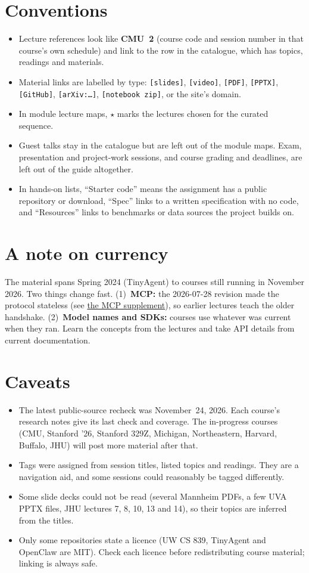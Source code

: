 \documentclass[10pt,oneside]{report}
\begin{document}
\section{Conventions}
\begin{itemize}
\item Lecture references look like \textbf{CMU~2} (course code and session number in that course's own schedule) and link to the row in the catalogue, which has topics, readings and materials.
\item Material links are labelled by type: \texttt{[slides]}, \texttt{[video]}, \texttt{[PDF]}, \texttt{[PPTX]}, \texttt{[GitHub]}, \texttt{[arXiv:\ldots]}, \texttt{[notebook zip]}, or the site's domain.
\item In module lecture maps, $\star$ marks the lectures chosen for the curated sequence.
\item Guest talks stay in the catalogue but are left out of the module maps. Exam, presentation and project-work sessions, and course grading and deadlines, are left out of the guide altogether.
\item In hands-on lists, ``Starter code'' means the assignment has a public repository or download, ``Spec'' links to a written specification with no code, and ``Resources'' links to benchmarks or data sources the project builds on.
\end{itemize}
\section{A note on currency}
The material spans Spring 2024 (TinyAgent) to courses still running in November 2026. Two things change fast. (1)~\textbf{MCP:} the 2026-07-28 revision made the protocol stateless (see \hyperref[sup-mcp]{the MCP supplement}), so earlier lectures teach the older handshake. (2)~\textbf{Model names and SDKs:} courses use whatever was current when they ran. Learn the concepts from the lectures and take API details from current documentation.
\section{Caveats}
\begin{itemize}
\item The latest public-source recheck was November~24, 2026. Each course's research notes give its last check and coverage. The in-progress courses (CMU, Stanford '26, Stanford 329Z, Michigan, Northeastern, Harvard, Buffalo, JHU) will post more material after that.
\item Tags were assigned from session titles, listed topics and readings. They are a navigation aid, and some sessions could reasonably be tagged differently.
\item Some slide decks could not be read (several Mannheim PDFs, a few UVA PPTX files, JHU lectures 7, 8, 10, 13 and 14), so their topics are inferred from the titles.
\item Only some repositories state a licence (UW CS 839, TinyAgent and OpenClaw are MIT). Check each licence before redistributing course material; linking is always safe.
\end{itemize}
\end{document}

